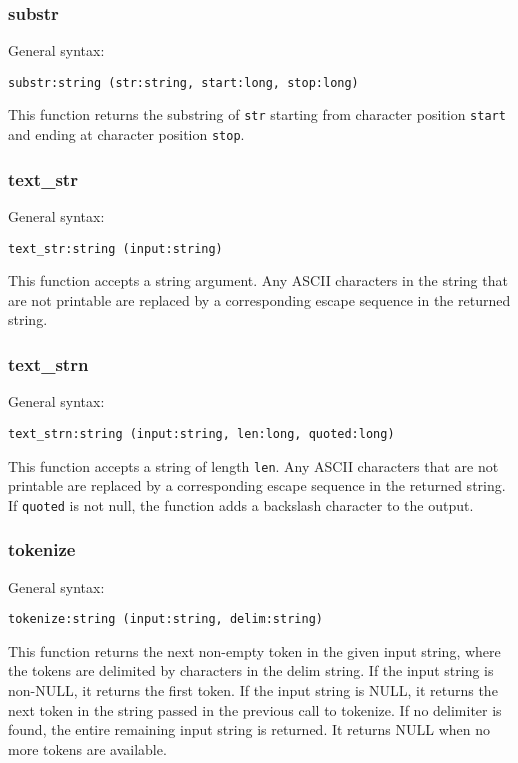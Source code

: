 \documentclass[twoside,english]{article}
\newenvironment{vindent}
{\begin{list}{}{\setlength{\listparindent}{6pt}}
\item[]}
{\end{list}}
\begin{document}
\subsubsection{substr}
General syntax:

\begin{vindent}
\begin{verbatim}
substr:string (str:string, start:long, stop:long)
\end{verbatim}
\end{vindent}
This function returns the substring of \texttt{str} starting from character
position \texttt{start} and ending at character position \texttt{stop}.


\subsubsection{text\_str}
General syntax:

\begin{vindent}
\begin{verbatim}
text_str:string (input:string)
\end{verbatim}
\end{vindent}
This function accepts a string argument. Any ASCII characters in the string
that are not printable are replaced by a corresponding escape sequence in
the returned string.


\subsubsection{text\_strn}
General syntax:

\begin{vindent}
\begin{verbatim}
text_strn:string (input:string, len:long, quoted:long)
\end{verbatim}
\end{vindent}
This function accepts a string of length \texttt{len}. Any ASCII characters
that are not printable are replaced by a corresponding escape sequence in
the returned string. If \texttt{quoted} is not null, the function adds a
backslash character to the output.


\subsubsection{tokenize}

General syntax:

\begin{vindent}
\begin{verbatim}
tokenize:string (input:string, delim:string)
\end{verbatim}
\end{vindent}
This function returns the next non-empty token in the given input string,
where the tokens are delimited by characters in the delim string.
If the input string is non-NULL, it returns the first token. If the input string
is NULL, it returns the next token in the string passed in the previous call
to tokenize. If no delimiter is found, the entire remaining input string
is returned.  It returns NULL when no more tokens are available.
\end{document}
